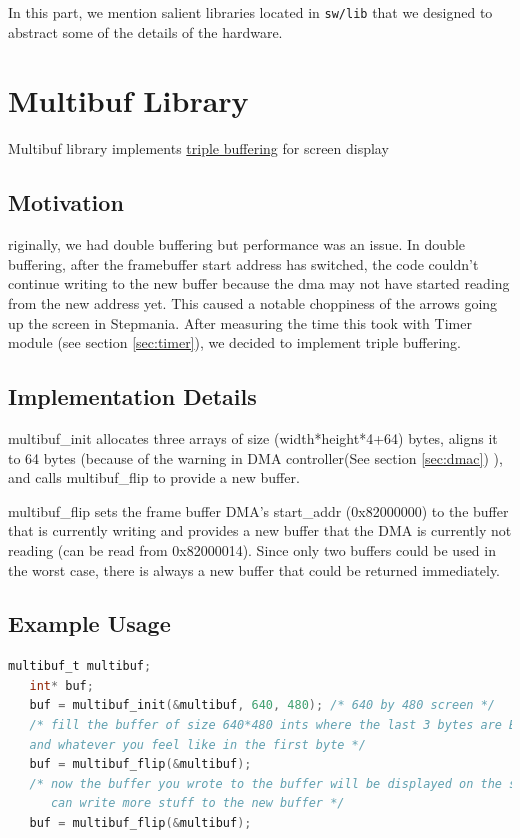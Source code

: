 \documentclass[10pt]{article}
\begin{document}
In this part, we mention salient libraries located in \texttt{sw/lib} that we 
designed to abstract some of the details of the hardware.

\section{Multibuf Library}

\label{sec:multibuf}

Multibuf library implements \href{http://en.wikipedia.org/wiki/Multiple_buffering#Triple_buffering}{triple buffering} for screen display 

\subsection{Motivation}

riginally, we had double buffering but performance was an issue. In double buffering, after the framebuffer start address has switched, the code couldn't continue writing to the new buffer because the dma may not have started reading from the new address yet. This caused a notable choppiness of the arrows going up the screen in Stepmania. After measuring the time this took with Timer module (see section \ref{sec:timer}), we decided to implement triple buffering. 

\subsection{Implementation Details}

multibuf\_init allocates three arrays of size (width*height*4+64) bytes, aligns it to 64 bytes (because of the warning in DMA controller(See section \ref{sec:dmac}) ), and calls multibuf\_flip to provide a new buffer.

multibuf\_flip sets the frame buffer DMA's start\_addr (0x82000000) to the buffer that is currently writing and provides a new buffer that the DMA is currently not reading (can be read from 0x82000014). Since only two buffers could be used in the worst case, there is always a new buffer that could be returned immediately.

\subsection{Example Usage}

\begin{lstlisting}[basicstyle=\footnotesize,language=C]
   multibuf_t multibuf;
   int* buf;
   buf = multibuf_init(&multibuf, 640, 480); /* 640 by 480 screen */
   /* fill the buffer of size 640*480 ints where the last 3 bytes are BGR (thanks to little endianness)
   and whatever you feel like in the first byte */
   buf = multibuf_flip(&multibuf); 
   /* now the buffer you wrote to the buffer will be displayed on the screen and you 
      can write more stuff to the new buffer */
   buf = multibuf_flip(&multibuf);
\end{lstlisting}
\end{document}
